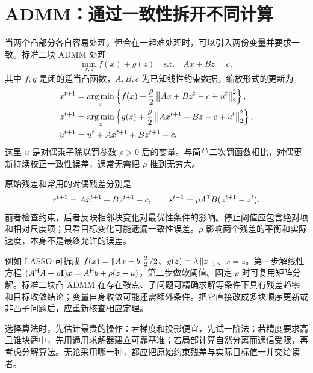 \section{ADMM：通过一致性拆开不同计算}
当两个凸部分各自容易处理，但合在一起难处理时，可以引入两份变量并要求一致。标准二块 ADMM 处理
\begin{equation}
 \min_{x,z} f(x)+g(z)\quad\text{s.t.}\quad Ax+Bz=c,
 \label{eq:admm-problem}
\end{equation}
其中 $f,g$ 是闭的适当凸函数，$A,B,c$ 为已知线性约束数据。缩放形式的更新为\cite{boyd2011}
\begin{align}
 x^{t+1}&=\operatorname*{arg\,min}_x\left\{f(x)+\frac\rho2\left\lVert Ax+Bz^t-c+u^t\right\rVert_2^2\right\},\\
 z^{t+1}&=\operatorname*{arg\,min}_z\left\{g(z)+\frac\rho2\left\lVert Ax^{t+1}+Bz-c+u^t\right\rVert_2^2\right\},\\
 u^{t+1}&=u^t+Ax^{t+1}+Bz^{t+1}-c.
\end{align}
这里 $u$ 是对偶乘子除以罚参数 $\rho>0$ 后的变量。与简单二次罚函数相比，对偶更新持续校正一致性误差，通常无需把 $\rho$ 推到无穷大。

原始残差和常用的对偶残差分别是
\begin{equation}
 r^{t+1}=Ax^{t+1}+Bz^{t+1}-c,\qquad
 s^{t+1}=\rho A^\mathsf T B(z^{t+1}-z^t).
\end{equation}
前者检查约束，后者反映相邻块变化对最优性条件的影响。停止阈值应包含绝对项和相对尺度项；只看目标变化可能遗漏一致性误差。$\rho$ 影响两个残差的平衡和实际速度，本身不是最终允许的误差。

例如 LASSO 可拆成 $f(x)=\left\lVert Ax-b\right\rVert_2^2/2$、$g(z)=\lambda\left\lVert z\right\rVert_1$、$x=z$。第一步解线性方程 $(A^\mathsf H A+\rho\mathbf I)x=A^\mathsf H b+\rho(z-u)$，第二步做软阈值。固定 $\rho$ 时可复用矩阵分解。标准二块凸 ADMM 在存在鞍点、子问题可精确求解等条件下具有残差趋零和目标收敛结论；变量自身收敛可能还需额外条件。把它直接改成多块顺序更新或非凸子问题后，应重新核查相应定理。

选择算法时，先估计最贵的操作：若梯度和投影便宜，先试一阶法；若精度要求高且锥块适中，先用通用求解器建立可靠基准；若局部计算自然分离而通信受限，再考虑分解算法。无论采用哪一种，都应把原始约束残差与实际目标值一并交给读者。
